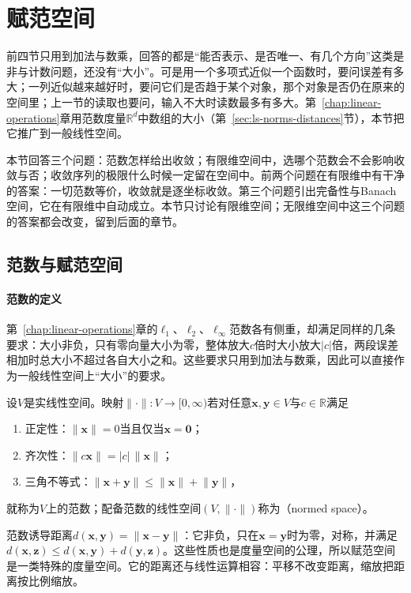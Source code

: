 
\section{赋范空间}
\label{sec:ls-normed-spaces}

前四节只用到加法与数乘，回答的都是“能否表示、是否唯一、有几个方向”这类是非与计数问题，还没有“大小”。可是用一个多项式近似一个函数时，要问误差有多大；一列近似越来越好时，要问它们是否趋于某个对象，那个对象是否仍在原来的空间里；上一节的读取也要问，输入不大时读数最多有多大。第~\ref{chap:linear-operations}章用范数度量$\mathbb R^d$中数组的大小（第~\ref{sec:ls-norms-distances}节），本节把它推广到一般线性空间。

本节回答三个问题：范数怎样给出收敛；有限维空间中，选哪个范数会不会影响收敛与否；收敛序列的极限什么时候一定留在空间中。前两个问题在有限维中有干净的答案：一切范数等价，收敛就是逐坐标收敛。第三个问题引出完备性与Banach空间，它在有限维中自动成立。本节只讨论有限维空间；无限维空间中这三个问题的答案都会改变，留到后面的章节。

\subsection{范数与赋范空间}
\label{sec:ls-normed-space-definition}

\paragraph{范数的定义}
第~\ref{chap:linear-operations}章的$\ell_1$、$\ell_2$、$\ell_\infty$范数各有侧重，却满足同样的几条要求：大小非负，只有零向量大小为零，整体放大$c$倍时大小放大$|c|$倍，两段误差相加时总大小不超过各自大小之和。这些要求只用到加法与数乘，因此可以直接作为一般线性空间上“大小”的要求。
\begin{definition}[赋范空间]
\label{def:ls-normed-space}
设$V$是实线性空间。映射$\lVert\cdot\rVert:V\to[0,\infty)$若对任意$\bm x,\bm y\in V$与$c\in\mathbb R$满足
\begin{enumerate}
 \item 正定性：$\lVert\bm x\rVert=0$当且仅当$\bm x=\bm0$；
 \item 齐次性：$\lVert c\bm x\rVert=|c|\,\lVert\bm x\rVert$；
 \item 三角不等式：$\lVert\bm x+\bm y\rVert\leq\lVert\bm x\rVert+\lVert\bm y\rVert$，
\end{enumerate}
就称为$V$上的范数；配备范数的线性空间$(V,\lVert\cdot\rVert)$称为（normed space）。
\end{definition}
范数诱导距离$d(\bm x,\bm y)=\lVert\bm x-\bm y\rVert$：它非负，只在$\bm x=\bm y$时为零，对称，并满足$d(\bm x,\bm z)\leq d(\bm x,\bm y)+d(\bm y,\bm z)$。这些性质也是度量空间的公理，所以赋范空间是一类特殊的度量空间。它的距离还与线性运算相容：平移不改变距离，缩放把距离按比例缩放。

